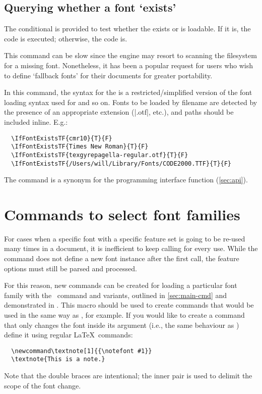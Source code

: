 \documentclass[a4paper]{l3doc}
\begin{document}
\subsection{Querying whether a font `exists'}


The conditional  is provided to test whether the  exists or is loadable.
If it is, the  code is executed; otherwise, the  code is.

This command can be slow since the engine may resort to scanning the filesystem for a missing font.
Nonetheless, it has been a popular request for users who wish to define `fallback fonts' for their documents for greater portability.

In this command, the syntax for the  is a restricted/simplified version of the font loading syntax used for  and so on.
Fonts to be loaded by filename are detected by the presence of an appropriate extension (|.otf|, etc.), and paths should be included inline.
E.g.:
\begin{Verbatim}
  \IfFontExistsTF{cmr10}{T}{F}
  \IfFontExistsTF{Times New Roman}{T}{F}
  \IfFontExistsTF{texgyrepagella-regular.otf}{T}{F}
  \IfFontExistsTF{/Users/will/Library/Fonts/CODE2000.TTF}{T}{F}
\end{Verbatim}

The  command is a synonym for the programming interface function  (\vref{sec:api}).



\section{Commands to select font families}

For cases when a specific font with a specific
feature set is going to be re-used many times in a document, it is inefficient
to keep calling  for every use. While the  command does not define
a new font instance after the first call, the feature options must still be
parsed and processed.

For this reason, new commands can be created for loading a particular font
family with the \cmd\newfontfamily\ command and variants,
outlined in \vref{sec:main-cmd} and demonstrated in .
This macro should be used to create commands that would be used in
the same way as \cmd\rmfamily, for example.
If you would like to create a command that only changes the font
inside its argument (i.e., the same behaviour as ) define it using regular \LaTeX\
commands:
\begin{Verbatim}
  \newcommand\textnote[1]{{\notefont #1}}
  \textnote{This is a note.}
\end{Verbatim}
Note that the double braces are intentional; the inner pair is used to
delimit the scope of the font change.
\end{document}
